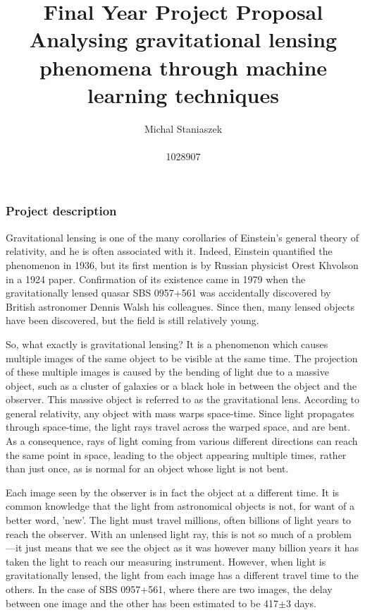 \documentclass{article}
\title{Final Year Project Proposal\\ \vspace{0.2cm} \large{Analysing gravitational lensing phenomena through machine learning techniques}}
\author{Michal Staniaszek \\\\ 1028907}
\begin{document}
\maketitle

\subsubsection*{Project description}

Gravitational lensing is one of the many corollaries of Einstein's general theory of relativity, and he is often associated with it. Indeed, Einstein quantified the phenomenon in 1936, but its first mention is by Russian physicist Orest Khvolson in a 1924 paper. Confirmation of its existence came in 1979 when the gravitationally lensed quasar SBS 0957+561 was accidentally discovered by British astronomer Dennis Walsh his colleagues. Since then, many lensed objects have been discovered, but the field is still relatively young.\par So, what exactly is gravitational lensing? It is a phenomenon which causes multiple images of the same object to be visible at the same time. The projection of these multiple images is caused by the bending of light due to a massive object, such as a cluster of galaxies or a black hole in between the object and the observer. This massive object is referred to as the gravitational lens. According to general relativity, any object with mass warps space-time. Since light propagates through space-time, the light rays travel across the warped space, and are bent. As a consequence, rays of light coming from various different directions can reach the same point in space, leading to the object appearing multiple times, rather than just once, as is normal for an object whose light is not bent.\par Each image seen by the observer is in fact the object at a different time. It is common knowledge that the light from astronomical objects is not, for want of a better word, 'new'. The light must travel millions, often billions of light years to reach the observer. With an unlensed light ray, this is not so much of a problem---it just means that we see the object as it was however many billion years it has taken the light to reach our measuring instrument. However, when light is gravitationally lensed, the light from each image has a different travel time to the others. In the case of SBS 0957+561, where there are two images, the delay between one image and the other has been estimated to be 417$\pm$3 days.
\end{document}
